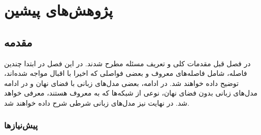 \chapter{پژوهش‌های پیشین}\label{chap2}
\minitoc

\section{مقدمه}\label{intro}
در فصل قبل مقدمات کلی و تعریف مسئله مطرح شدند. در این فصل در ابتدا چندین فاصله، شامل فاصله‌های معروف و بعضی فواصلی که اخیرا با اقبال مواجه شده‌اند، توضیح داده خواهند شد. در ادامه، بعضی مدل‌های زبانی با فضای نهان و در ادامه مدل‌های زبانی بدون فضای نهان، نوعی از شبکه‌ها که به \normalizingflownets{} معروف هستند، معرفی خواهد شد. در نهایت نیز مدل‌های زبانی شرطی شرح داده خواهند شد.
\subsection{پیش‌نیازها}

